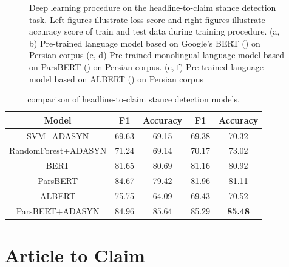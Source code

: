 \begin{figure}
	\qquad
	
	
	\caption{Deep learning procedure on the headline-to-claim stance detection task. Left figures illustrate loss score and right figures illustrate accuracy score of train and test data during training procedure. (a, b) Pre-trained language model based on Google's BERT (\cite{parsbert}) on Persian corpus (c, d) Pre-trained monolingual language model based on ParsBERT (\cite{parsbert}) on Persian corpus. (e, f) Pre-trained language model based on ALBERT (\cite{albert}) on Persian corpus}%
	\label{fig:deep}%
\end{figure}

\begin{table}[t]
	\centering
	\small
	\caption{comparison of headline-to-claim stance detection models.}
	\def\arraystretch{1.3}%
	\setlength{\extrarowheight}{5pt}%
	\begin{tabular}{|c|c|c|c|c|}
		\hline{Model} & {F1} & {Accuracy} & {F1} & {Accuracy}\\
		\hline \hline
		{SVM+ADASYN} & {69.63} & {69.15} & {69.38} & {70.32}\\
		\hline
		{RandomForest+ADASYN} & {71.24} & {69.14} & {70.17} & {73.02}\\
		\hline
		{BERT} & {81.65} & {80.69} & {81.16} & {80.92}\\
		\hline
		{ParsBERT} & {84.67} & {79.42} & {81.96} & {81.11}\\
		\hline
		{ALBERT} & {75.75} & {64.09} & {69.43} & {70.52}\\
		\hline
		{ParsBERT+ADASYN} & {84.96} & {85.64} & {85.29} & {\textbf{85.48}}\\
		\hline
	\end{tabular}
	\label{tbl:allstance}
\end{table}


\section{Article to Claim}


